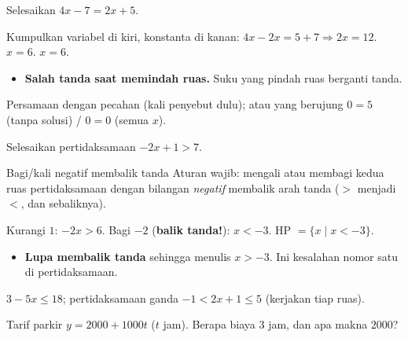 \begin{soalbox}{}
Selesaikan $4x-7=2x+5$.
\end{soalbox}

\jawab
{} Kumpulkan variabel di kiri, konstanta di kanan:
$4x-2x=5+7\Rightarrow 2x=12$.
 $x=6$.
\jadi $x=6$.

\begin{jebakan}
\begin{itemize}[leftmargin=*,topsep=2pt]
  \item \textbf{Salah tanda saat memindah ruas.} Suku yang pindah ruas berganti
  tanda.
\end{itemize}
\end{jebakan}

\begin{variasi}
Persamaan dengan pecahan (kali penyebut dulu); atau yang berujung $0=5$ (tanpa
solusi) / $0=0$ (semua $x$).
\end{variasi}

\begin{soalbox}{}
Selesaikan pertidaksamaan $-2x+1>7$.
\end{soalbox}

\begin{ingat}{Bagi/kali negatif membalik tanda}
Aturan wajib: mengali atau membagi kedua ruas pertidaksamaan dengan bilangan
\emph{negatif} membalik arah tanda ($>$ menjadi $<$, dan sebaliknya).
\end{ingat}

\jawab
{} Kurangi $1$: $-2x>6$.
 Bagi $-2$ (\textbf{balik tanda!}): $x<-3$.
\jadi HP $=\{x\mid x<-3\}$.

\begin{jebakan}
\begin{itemize}[leftmargin=*,topsep=2pt]
  \item \textbf{Lupa membalik tanda} sehingga menulis $x>-3$. Ini kesalahan
  nomor satu di pertidaksamaan.
\end{itemize}
\end{jebakan}

\begin{variasi}
$3-5x\le18$; pertidaksamaan ganda $-1<2x+1\le5$ (kerjakan tiap ruas).
\end{variasi}

\begin{soalbox}{}
Tarif parkir $y=2000+1000t$ ($t$ jam). Berapa biaya $3$ jam, dan apa makna
$2000$?
\end{soalbox}

